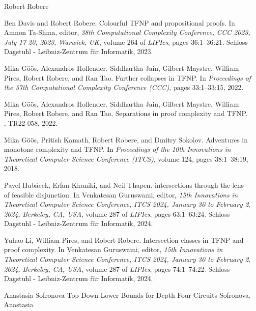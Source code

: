 \documentclass[report]{owrart}
\begin{document}
\begin{report}
\begin{talk}{Robert Robere}
\begin{thebibliography}{99}
Ben Davis and Robert Robere.
\newblock Colourful {TFNP} and propositional proofs.
\newblock In Amnon Ta{-}Shma, editor, {\em 38th Computational Complexity
  Conference, {CCC} 2023, July 17-20, 2023, Warwick, {UK}}, volume 264 of {\em
  LIPIcs}, pages 36:1--36:21. Schloss Dagstuhl - Leibniz-Zentrum f{\"{u}}r
  Informatik, 2023.

Mika G{\"o}{\"o}s, Alexandros Hollender, Siddhartha Jain, Gilbert Maystre,
  William Pires, Robert Robere, and Ran Tao.
\newblock Further collapses in {TFNP}.
\newblock In {\em Proceedings of the 37th Computational Complexity Conference
  (CCC)}, pages 33:1--33:15, 2022.

Mika G{\"{o}}{\"{o}}s, Alexandros Hollender, Siddhartha Jain, Gilbert Maystre,
  William Pires, Robert Robere, and Ran Tao.
\newblock Separations in proof complexity and {TFNP}.
, {TR22-058}, 2022.

Mika G{\"o}{\"o}s, Pritish Kamath, Robert Robere, and Dmitry Sokolov.
\newblock Adventures in monotone complexity and {TFNP}.
\newblock In {\em Proceedings of the 10th Innovations in Theoretical Computer
  Science Conference (ITCS)}, volume 124, pages 38:1--38:19, 2018.

Pavel Hub{\'{a}}cek, Erfan Khaniki, and Neil Thapen.
 intersections through the lens of feasible disjunction.
\newblock In Venkatesan Guruswami, editor, {\em 15th Innovations in Theoretical
  Computer Science Conference, {ITCS} 2024, January 30 to February 2, 2024,
  Berkeley, CA, {USA}}, volume 287 of {\em LIPIcs}, pages 63:1--63:24. Schloss
  Dagstuhl - Leibniz-Zentrum f{\"{u}}r Informatik, 2024.

Yuhao Li, William Pires, and Robert Robere.
\newblock Intersection classes in {TFNP} and proof complexity.
\newblock In Venkatesan Guruswami, editor, {\em 15th Innovations in Theoretical
  Computer Science Conference, {ITCS} 2024, January 30 to February 2, 2024,
  Berkeley, CA, {USA}}, volume 287 of {\em LIPIcs}, pages 74:1--74:22. Schloss
  Dagstuhl - Leibniz-Zentrum f{\"{u}}r Informatik, 2024.
\end{thebibliography}


\end{talk}

\begin{talk}{Anastasia Sofronova}
  {Top-Down Lower Bounds for Depth-Four Circuits}
  {Sofronova, Anastasia}
  

\end{talk}
\end{report}
\end{document}
